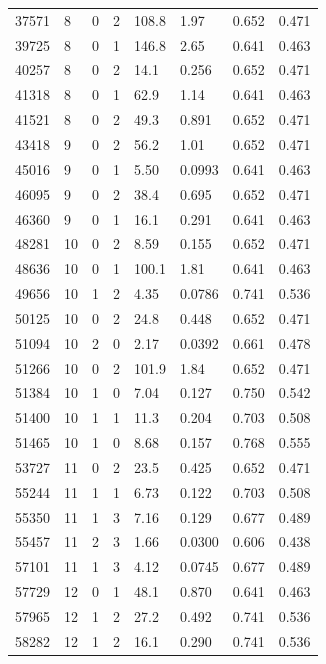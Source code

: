 \documentclass[preview]{standalone}
\begin{document}
{{{\begin{tabular}{L{1.2cm}C{1.2cm} C{0.3cm}C{0.5cm} C{1.4cm}C{1.4cm} C{1.4cm}C{1.4cm}}
  37571  &     8  & 0     &  2 &  108.8  & 1.97  & 0.652 &  0.471   \\ 
  39725  &     8  & 0     &  1 &  146.8  & 2.65  & 0.641 &  0.463   \\ 
  40257  &     8  & 0     &  2 &  14.1  & 0.256  & 0.652 &  0.471   \\ 
  41318  &     8  & 0     &  1 &  62.9  & 1.14  & 0.641 &  0.463   \\ 
  41521  &     8  & 0     &  2 &  49.3  & 0.891  & 0.652 &  0.471   \\ 
  43418  &     9  & 0     &  2 &  56.2  & 1.01  & 0.652 &  0.471   \\ 
  45016  &     9  & 0     &  1 &  5.50  & 0.0993  & 0.641 &  0.463   \\ 
  46095  &     9  & 0     &  2 &  38.4  & 0.695  & 0.652 &  0.471   \\ 
  46360  &     9  & 0     &  1 &  16.1  & 0.291  & 0.641 &  0.463   \\ 
  48281  &    10  & 0     &  2 &  8.59  & 0.155  & 0.652 &  0.471   \\ 
  48636  &    10  & 0     &  1 &  100.1  & 1.81  & 0.641 &  0.463   \\ 
  49656  &    10  & 1     &  2 &  4.35  & 0.0786  & 0.741 &  0.536   \\ 
  50125  &    10  & 0     &  2 &  24.8  & 0.448  & 0.652 &  0.471   \\ 
  51094  &    10  & 2     &  0 &  2.17  & 0.0392  & 0.661 &  0.478   \\ 
  51266  &    10  & 0     &  2 &  101.9  & 1.84  & 0.652 &  0.471   \\ 
  51384  &    10  & 1     &  0 &  7.04  & 0.127  & 0.750 &  0.542   \\ 
  51400  &    10  & 1     &  1 &  11.3  & 0.204  & 0.703 &  0.508   \\ 
  51465  &    10  & 1     &  0 &  8.68  & 0.157  & 0.768 &  0.555   \\ 
  53727  &    11  & 0     &  2 &  23.5  & 0.425  & 0.652 &  0.471   \\ 
  55244  &    11  & 1     &  1 &  6.73  & 0.122  & 0.703 &  0.508   \\ 
  55350  &    11  & 1     &  3 &  7.16  & 0.129  & 0.677 &  0.489   \\ 
  55457  &    11  & 2     &  3 &  1.66  & 0.0300  & 0.606 &  0.438   \\ 
  57101  &    11  & 1     &  3 &  4.12  & 0.0745  & 0.677 &  0.489   \\ 
  57729  &    12  & 0     &  1 &  48.1  & 0.870  & 0.641 &  0.463   \\ 
  57965  &    12  & 1     &  2 &  27.2  & 0.492  & 0.741 &  0.536   \\ 
  58282  &    12  & 1     &  2 &  16.1  & 0.290  & 0.741 &  0.536   \\ 
\hline 
\end{tabular} 

}}}
\end{document}
